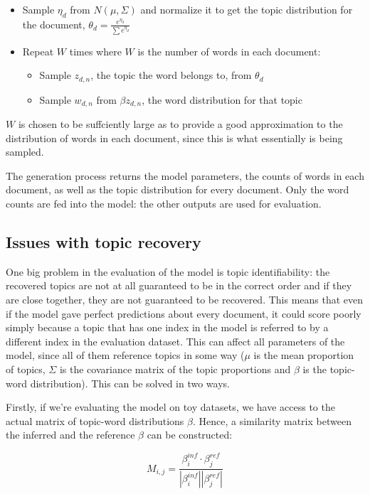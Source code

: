 \documentclass[12pt,a4paper,twoside,openright]{report}
\begin{document}
\begin{itemize}[noitemsep]
\item Sample $\eta_d$ from $N(\mu, \Sigma)$ and normalize it to get the topic distribution for the document, $\theta_d = \frac{e^{\eta_d}}{\sum{e^{\eta_d}}}$
\item Repeat $W$ times where $W$ is the number of words in each document:
\begin{itemize}[noitemsep]
\item Sample $z_{d, n}$, the topic the word belongs to, from $\theta_d$
\item Sample $w_{d, n}$ from $\beta{z_{d, n}}$, the word distribution for that topic
\end{itemize}
\end{itemize}

$W$ is chosen to be suffciently large as to provide a good approximation to the distribution of words in each document, since this is what essentially is being sampled.

The generation process returns the model parameters, the counts of words in each document, as well as the topic distribution for every document. Only the word counts are fed into the model: the other outputs are used for evaluation.

\subsection{Issues with topic recovery}

One big problem in the evaluation of the model is topic identifiability: the recovered topics are not at all guaranteed to be in the correct order and if they are close together, they are not guaranteed to be recovered. This means that even if the model gave perfect predictions about every document, it could score poorly simply because a topic that has one index in the model is referred to by a different index in the evaluation dataset. This can affect all parameters of the model, since all of them reference topics in some way ($\mu$ is the mean proportion of topics, $\Sigma$ is the covariance matrix of the topic proportions and $\beta$ is the topic-word distribution). This can be solved in two ways.

Firstly, if we're evaluating the model on toy datasets, we have access to the actual matrix of topic-word distributions $\beta$. Hence, a similarity matrix between the inferred and the reference $\beta$ can be constructed:

\begin{equation}\label{eq:beta_similarity matrix}
M_{i,j} = \frac{\beta^{inf}_i \cdot \beta^{ref}_j}{|\beta^{inf}_i||\beta^{ref}_j|}
\end{equation}
\end{document}

